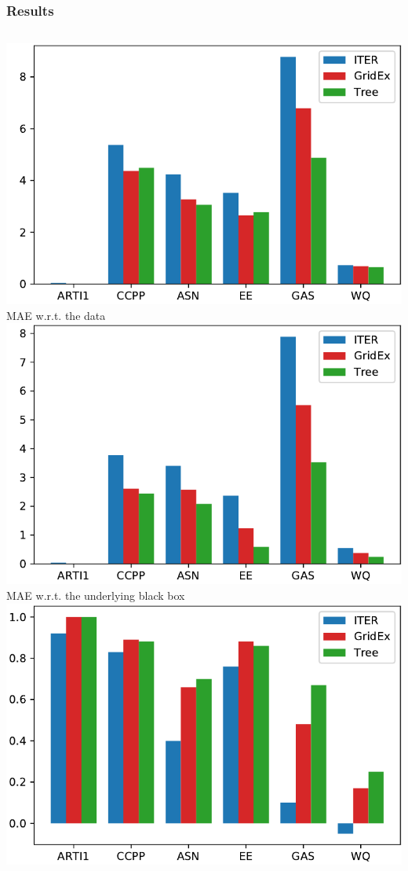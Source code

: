 \documentclass[presentation]{beamer}
\begin{document}
\begin{frame}[allowframebreaks]
	\frametitle{Results}
	\scriptsize
	\begin{columns}[t]
			\centering
			\includegraphics[width=.8\columnwidth]{img/comp/mae.pdf}\\
			MAE w.r.t. the data\vspace{10px}
			\includegraphics[width=.8\columnwidth]{img/comp/maefid.pdf}\\
			MAE w.r.t. the underlying black box
			\centering
			\includegraphics[width=.8\columnwidth]{img/comp/r2.pdf}\\

\end{columns}
\end{frame}
\end{document}

